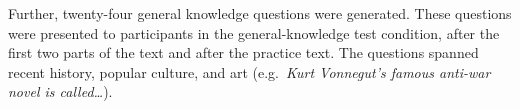 Further, twenty-four general knowledge questions were generated. These
questions were presented to participants in the general-knowledge test
condition, after the first two parts of the text and after the practice
text. The questions spanned recent history, popular culture, and art
(e.g.~\textit{Kurt Vonnegut's famous anti-war novel
is called\ldots}).


